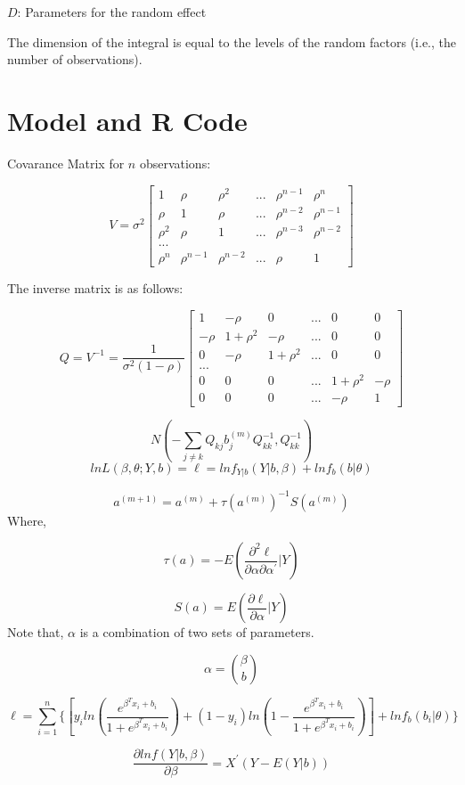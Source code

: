 \documentclass[]{book}
\begin{document}
\(D\): Parameters for the random effect

The dimension of the integral is equal to the levels of the random
factors (i.e., the number of observations).

\section{Model and R Code}\label{model-and-r-code}

Covarance Matrix for \(n\) observations:

\[V=\sigma^2 \begin{bmatrix} 1 & \rho & \rho^2 & ... & \rho^{n-1} & \rho^n \\ \rho & 1 & \rho & ... & \rho^{n-2}& \rho^{n-1}\\ \rho^2 & \rho & 1 & ... & \rho^{n-3}& \rho^{n-2} \\ ...\\ \rho^n & \rho^{n-1} & \rho^{n-2} & ... & \rho & 1 \end{bmatrix}\]

The inverse matrix is as follows:

\[Q=V^{-1}=\frac{1}{\sigma^2(1-\rho)} \begin{bmatrix} 1 & -\rho & 0 & ... & 0 & 0 \\ -\rho & 1+\rho^2 & -\rho & ... & 0 & 0\\ 0 & -\rho & 1+\rho^2 & ... & 0 & 0 \\ ...\\ 0 & 0 & 0 & ... & 1+\rho^2 &-\rho\\ 0 & 0 & 0 & ... & -\rho & 1 \end{bmatrix}\]

\[N(-\sum_{j\neq k} Q_{kj}b_j^{(m)}Q_{kk}^{-1},Q_{kk}^{-1})\]
\[ln L(\beta, \theta; Y,b)=\ell=lnf_{Y|b}(Y|b,\beta)+lnf_b(b|\theta)\]

\[a^{(m+1)}=a^{(m)}+\tau(a^{(m)})^{-1} S(a^{(m)})\] Where,

\[\tau(a) = -E(\frac{\partial^2 \ell}{\partial \alpha \partial \alpha^{'}}|Y)\]

\[S(a) = E(\frac{\partial \ell}{\partial \alpha }|Y)\] Note that,
\(\alpha\) is a combination of two sets of parameters.

\[\alpha = \binom{\beta}{b} \]

\[\ell=\sum_{i=1}^{n}\{[y_i ln (\frac{e^{\beta^Tx_i+b_i}}{1+e^{\beta^Tx_i+b_i}}) + (1-y_i) ln(1-\frac{e^{\beta^Tx_i+b_i}}{1+e^{\beta^Tx_i+b_i}})]+lnf_b(b_i|\theta)\}\]

\[\frac{\partial lnf(Y|b, \beta)}{\partial \beta}=X^{'}(Y-E(Y|b))\]
\end{document}
